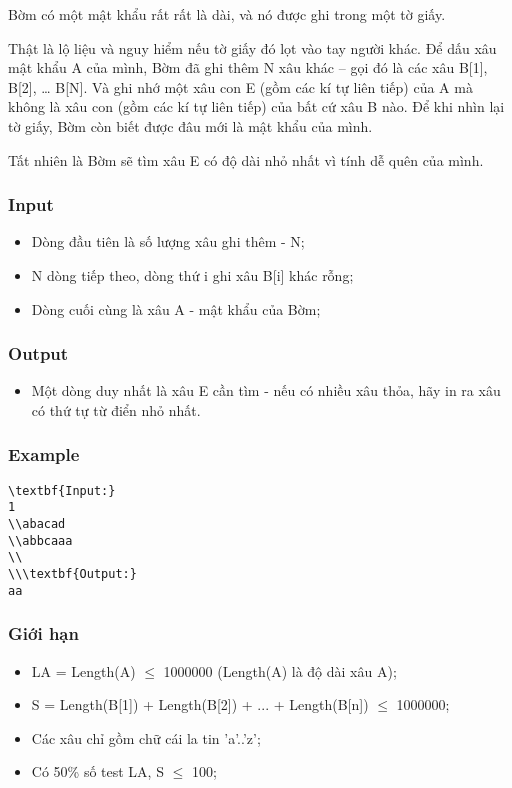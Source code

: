 



   Bờm có một mật khẩu rất rất là dài, và nó được ghi trong một tờ giấy.  

   Thật là lộ liệu và nguy hiểm nếu tờ giấy đó lọt vào tay người khác. Để dấu xâu mật khẩu A của mình, Bờm đã ghi thêm N xâu khác – gọi đó là các xâu B[1], B[2], … B[N]. Và ghi nhớ một xâu con E (gồm các kí tự liên tiếp) của A mà không là xâu con (gồm các kí tự liên tiếp) của bất cứ xâu B nào. Để khi nhìn lại tờ giấy, Bờm còn biết được đâu mới là mật khẩu của mình.  

   Tất nhiên là Bờm sẽ tìm xâu E có độ dài nhỏ nhất vì tính dễ quên của mình.  

\subsubsection{   Input  }
\begin{itemize}
	\item     Dòng đầu tiên là số lượng xâu ghi thêm - N;   
	\item     N dòng tiếp theo, dòng thứ i ghi xâu B[i] khác rỗng;   
	\item     Dòng cuối cùng là xâu A - mật khẩu của Bờm;   
\end{itemize}

\subsubsection{   Output  }
\begin{itemize}
	\item     Một dòng duy nhất là xâu E cần tìm - nếu có nhiều xâu thỏa, hãy in ra xâu có thứ tự từ điển nhỏ nhất.   
\end{itemize}

\subsubsection{   Example  }
\begin{verbatim}
\textbf{Input:}
1
\\abacad
\\abbcaaa
\\
\\\textbf{Output:}
aa\end{verbatim}

\subsubsection{   Giới hạn  }
\begin{itemize}
	\item     LA = Length(A)  $\le$  1000000 (Length(A) là độ dài xâu A);   
	\item     S = Length(B[1]) + Length(B[2]) + ... + Length(B[n])  $\le$  1000000;   
	\item     Các xâu chỉ gồm chữ cái la tin 'a'..'z';   
	\item     Có 50\% số test LA, S  $\le$  100;   
\end{itemize}
